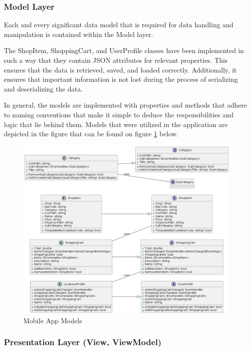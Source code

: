\subsubsection{Model Layer}

Each and every significant data model that is required for data handling and manipulation is contained within the Model layer. 

The ShopItem, ShoppingCart, and UserProfile classes have been implemented in such a way that they contain JSON attributes for relevant properties. This ensures that the data is retrieved, saved, and loaded correctly. Additionally, it ensures that important information is not lost during the process of serializing and deserializing the data. 

In general, the models are implemented with properties and methods that adhere to naming conventions that make it simple to deduce the responsibilities and logic that lie behind them. Models that were utilized in the application are depicted in the figure that can be found on figure \ref{fig:appmodels} below.

\begin{figure}[H]
	\centering
	\includegraphics[width=1\linewidth]{img/app_models.png}
	\caption{Mobile App Models}
	\label{fig:appmodels}
\end{figure}

\subsubsection{Presentation Layer (View, ViewModel)}


